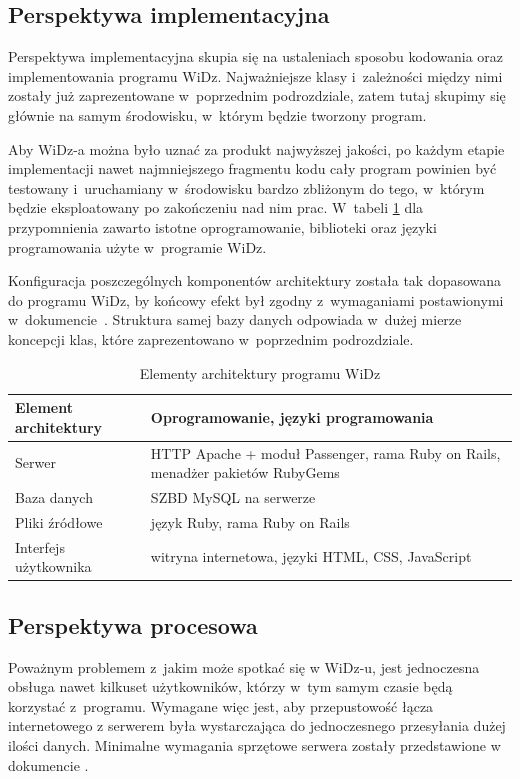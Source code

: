 \documentclass[12pt,leqno,twoside]{mwart}
\begin{document}
\subsection{Perspektywa implementacyjna}
\noindent Perspektywa implementacyjna skupia się na ustaleniach sposobu kodowania oraz implementowania programu WiDz. Najważniejsze klasy i~zależności między nimi zostały już zaprezentowane w~poprzednim podrozdziale, zatem tutaj skupimy się głównie na samym środowisku, w~którym będzie tworzony program.

\indent Aby WiDz-a można było uznać za produkt najwyższej jakości, po każdym etapie implementacji nawet najmniejszego fragmentu kodu cały program powinien być testowany i~uruchamiany w~środowisku bardzo zbliżonym do tego, w~którym będzie eksploatowany po zakończeniu nad nim prac. W~tabeli \ref{elementy_architektury} dla przypomnienia zawarto istotne oprogramowanie, biblioteki oraz języki programowania użyte w~programie WiDz.

\indent Konfiguracja poszczególnych komponentów architektury została tak dopasowana do programu WiDz, by końcowy efekt był zgodny z~wymaganiami postawionymi w~dokumencie~\cite{WYM}. Struktura samej bazy danych odpowiada w~dużej mierze koncepcji klas, które zaprezentowano w~poprzednim podrozdziale.
\begin{table}[h]
	\centering
	\caption{Elementy architektury programu WiDz}
		\begin{tabular}{|l|p{10cm}|}
		\hline
		\textbf{Element architektury} & \textbf{Oprogramowanie, języki programowania} \\ \hline
		Serwer & HTTP Apache + moduł Passenger, rama Ruby on Rails, menadżer pakietów RubyGems \\ \hline
		Baza danych & SZBD MySQL na serwerze \\ \hline
		Pliki źródłowe & język Ruby, rama Ruby on Rails \\ \hline
		Interfejs użytkownika & witryna internetowa, języki HTML, CSS, JavaScript \\ \hline
		\end{tabular}
	\label{elementy_architektury}
\end{table}

\subsection{Perspektywa procesowa}
\noindent Poważnym problemem z~jakim może spotkać się w WiDz-u, jest jednoczesna obsługa nawet kilkuset użytkowników, którzy w~tym samym czasie będą korzystać z~programu. Wymagane więc jest, aby przepustowość łącza internetowego z serwerem była wystarczająca do jednoczesnego przesyłania dużej ilości danych. Minimalne wymagania sprzętowe serwera zostały przedstawione w dokumencie \cite{WYM}.
\end{document}
